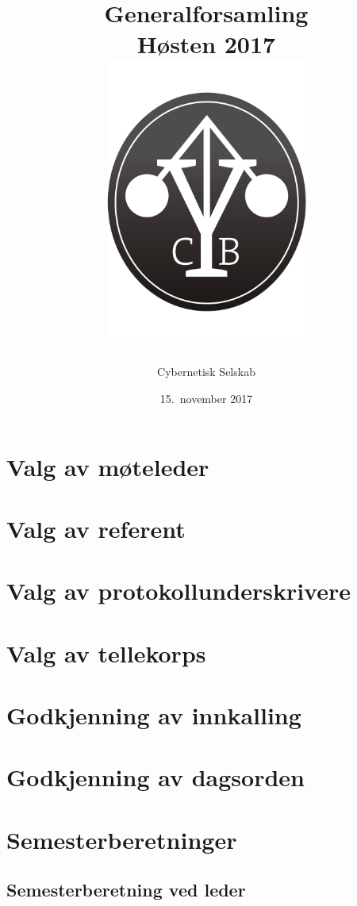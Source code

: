 \documentclass[10pt,norsk,a4paper]{article}
\title{Generalforsamling \\
	Høsten 2017\\[3cm]
	\includegraphics[width=0.5\textwidth]{cyblogoa3.pdf}\\[-.5cm]}
\date{15.\ november 2017}
\author{Cybernetisk Selskab}
\begin{document}
\maketitle{}
\newpage
\tableofcontents{}


\section{Valg av møteleder}

\section{Valg av referent}

\section{Valg av protokollunderskrivere}

\section{Valg av tellekorps}

\section{Godkjenning av innkalling}

\section{Godkjenning av dagsorden}

\section{Semesterberetninger}
\subsection{Semesterberetning ved leder}
\end{document}
